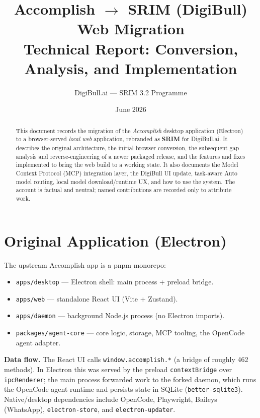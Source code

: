 \documentclass[11pt,a4paper]{article}
\title{\textbf{Accomplish $\rightarrow$ SRIM (DigiBull) Web Migration}\\[2pt]
\large Technical Report: Conversion, Analysis, and Implementation}
\author{DigiBull.ai --- SRIM 3.2 Programme}
\date{June 2026}
\begin{document}
\maketitle

\begin{abstract}
This document records the migration of the \emph{Accomplish} desktop application
(Electron) to a browser-served \emph{local web} application, rebranded as
\textbf{SRIM} for DigiBull.ai. It describes the original architecture, the initial
browser conversion, the subsequent gap analysis and reverse-engineering of a
newer packaged release, and the features and fixes implemented to bring the web
build to a working state. It also documents the Model Context Protocol (MCP)
integration layer, the DigiBull UI update, task-aware Auto model routing, local
model download/runtime UX, and how to use the system. The account is factual and
neutral; named contributions are recorded only to attribute work.
\end{abstract}

\tableofcontents
\vspace{1em}

\section{Original Application (Electron)}
The upstream Accomplish app is a pnpm monorepo:

\begin{itemize}[leftmargin=1.4em,topsep=2pt]
  \item \texttt{apps/desktop} --- Electron shell: main process + preload bridge.
  \item \texttt{apps/web} --- standalone React UI (Vite + Zustand).
  \item \texttt{apps/daemon} --- background Node.js process (no Electron imports).
  \item \texttt{packages/agent-core} --- core logic, storage, MCP tooling, the
        OpenCode agent adapter.
\end{itemize}

\textbf{Data flow.} The React UI calls \verb|window.accomplish.*| (a bridge of
roughly 462 methods). In Electron this was served by the preload
\verb|contextBridge| over \verb|ipcRenderer|; the main process forwarded work to
the forked daemon, which runs the OpenCode agent runtime and persists state in
SQLite (\verb|better-sqlite3|). Native/desktop dependencies include OpenCode,
Playwright, Baileys (WhatsApp), \verb|electron-store|, and \verb|electron-updater|.
\end{document}
